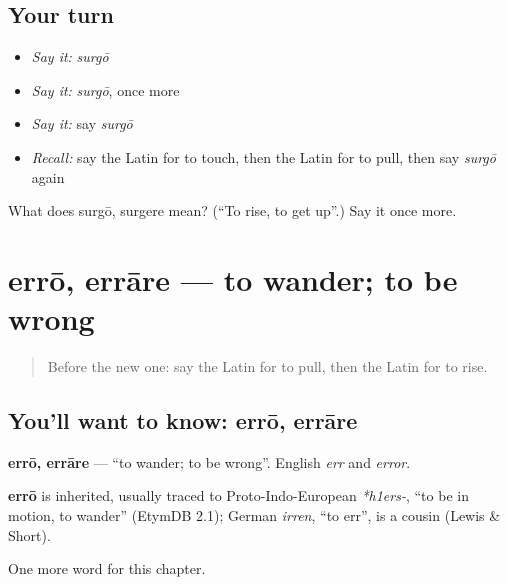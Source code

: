 \subsection*{Your turn}
\begin{itemize}
\raggedright
  \item \emph{Say it:} \emph{surgō}
  \item \emph{Say it:} \emph{surgō}, once more
  \item \emph{Say it:} say \emph{surgō}
  \item \emph{Recall:} say the Latin for to touch, then the Latin for to pull, then say \emph{surgō} again
\end{itemize}

\begin{tcolorbox}[breakable,colback=teal!4,colframe=teal!35!black,title={Before you move on}]
What does surgō, surgere mean? (\textquotedblleft{}To rise, to get up\textquotedblright{}.) Say it once more.
\end{tcolorbox}
\section[errō, errāre]{errō, errāre — to wander; to be wrong}

\label{lesson:LA-C101-erro}



\begin{quote}
Before the new one: say the Latin for to pull, then the Latin for to rise.
\end{quote}

\subsection*{You'll want to know: errō, errāre}
\textbf{errō, errāre} — \textquotedblleft{}to wander; to be wrong\textquotedblright{}. English \emph{err} and \emph{error}.

\begin{cousinweb}
\textbf{errō} is inherited, usually traced to Proto-Indo-European \emph{*h1ers-}, \textquotedblleft{}to be in motion, to wander\textquotedblright{} (EtymDB 2.1); German \emph{irren}, \textquotedblleft{}to err\textquotedblright{}, is a cousin (Lewis \& Short).
\end{cousinweb}

\begin{grammarlens}[title={What you've built}]
One more word for this chapter.
\end{grammarlens}


